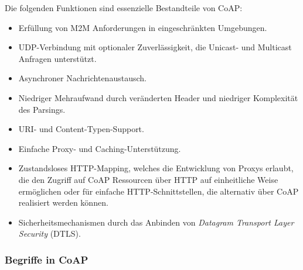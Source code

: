 Die folgenden Funktionen sind essenzielle Bestandteile von CoAP:
\begin{itemize}
    \item Erfüllung von M2M Anforderungen in eingeschränkten Umgebungen.
    \item UDP-Verbindung mit optionaler Zuverlässigkeit, die Unicast- und Multicast Anfragen unterstützt.
    \item Asynchroner Nachrichtenaustausch.
    \item Niedriger Mehraufwand durch veränderten Header und niedriger Komplexität des Parsings.
    \item URI- und Content-Typen-Support.
    \item Einfache Proxy- und Caching-Unterstützung.
    \item Zustandsloses HTTP-Mapping, welches die Entwicklung von Proxys erlaubt, die den Zugriff auf CoAP Ressourcen über HTTP auf einheitliche Weise ermöglichen oder für einfache HTTP-Schnittstellen, die alternativ über CoAP realisiert werden können.
    \item Sicherheitsmechanismen durch das Anbinden von \textit{Datagram Transport Layer Security} (DTLS).
\end{itemize}

\subsubsection{Begriffe in CoAP}
\label{subsubsec:begiffe-in-coap}

